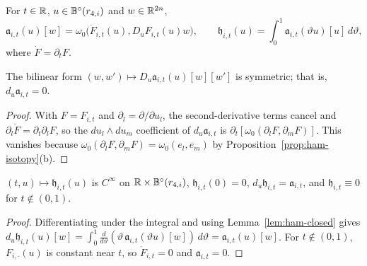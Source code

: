 \begin{definition}\label{def:ham-source-primitive}
For $t\in\mathbb{R}$, $u\in\mathbb{B}^\circ(r_{4,i})$ and $w\in\mathbb{R}^{2n}$,
\[
 \mathfrak a_{i,t}(u)[w]=\omega_0\big(\dot F_{i,t}(u),D_uF_{i,t}(u)w\big),\qquad
 \mathfrak h_{i,t}(u)=\int_0^1\mathfrak a_{i,t}(\vartheta u)[u]\,d\vartheta ,
\]
where $\dot F=\partial_tF$.
\end{definition}

\begin{lemma}\label{lem:ham-closed}
The bilinear form $(w,w')\mapsto D_u\mathfrak a_{i,t}(u)[w][w']$ is symmetric; that is, $d_u\mathfrak a_{i,t}=0$.
\end{lemma}

\begin{proof}
With $F=F_{i,t}$ and $\partial_l=\partial/\partial u_l$, the second-derivative terms cancel and $\partial_l\dot F=\partial_t\partial_lF$, so the $du_l\wedge du_m$ coefficient of $d_u\mathfrak a_{i,t}$ is $\partial_t[\omega_0(\partial_lF,\partial_mF)]$. This vanishes because $\omega_0(\partial_lF,\partial_mF)=\omega_0(e_l,e_m)$ by Proposition~\ref{prop:ham-isotopy}(b).
\end{proof}

\begin{lemma}\label{lem:ham-poincare}
$(t,u)\mapsto\mathfrak h_{i,t}(u)$ is $C^\infty$ on $\mathbb{R}\times\mathbb{B}^\circ(r_{4,i})$, $\mathfrak h_{i,t}(0)=0$,
$d_u\mathfrak h_{i,t}=\mathfrak a_{i,t}$, and $\mathfrak h_{i,t}\equiv0$ for $t\notin(0,1)$.
\end{lemma}

\begin{proof}
Differentiating under the integral and using Lemma~\ref{lem:ham-closed} gives $d_u\mathfrak h_{i,t}(u)[w]=\int_0^1\frac{d}{d\vartheta}(\vartheta\,\mathfrak a_{i,t}(\vartheta u)[w])\,d\vartheta=\mathfrak a_{i,t}(u)[w]$. For $t\notin(0,1)$, $F_{i,\cdot}(u)$ is constant near $t$, so $\dot F_{i,t}=0$ and $\mathfrak a_{i,t}=0$.
\end{proof}

